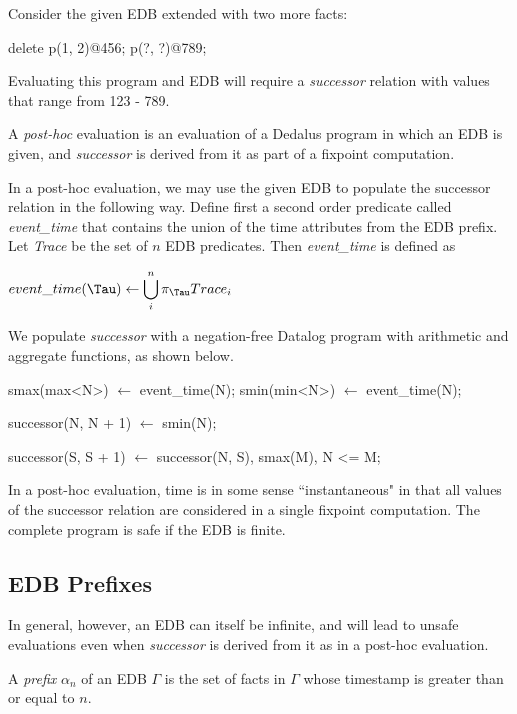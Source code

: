\begin{itemize}
Consider the given EDB extended with two more facts:

\begin{Dedalus}
delete p(1, 2)@456;
p(?, ?)@789;
\end{Dedalus}

Evaluating this program and EDB will require a \emph{successor} relation with values that range from 123 - 789.

\begin{definition}
A \emph{post-hoc} evaluation is an evaluation of a Dedalus program in which an EDB is given, and \emph{successor} is derived from it
as part of a fixpoint computation.
\end{definition}

In a post-hoc evaluation, we may use the given EDB to populate the successor relation in the following way.
Define first a second order predicate called \emph{event\_time}
that contains the union of the time attributes from the EDB prefix. Let \emph{Trace} be the set of $n$ EDB predicates.  
Then \emph{event\_time} is defined as

$event\_time(\Tau) \leftarrow \displaystyle\bigcup_{i}^n \pi_{\Tau}Trace_{i}$

We populate \emph{successor} with a negation-free Datalog program with arithmetic and aggregate functions, as shown below.

\begin{Dedalus}
smax(max<N>) \(\leftarrow\) event\_time(N);
smin(min<N>) \(\leftarrow\) event\_time(N);

successor(N, N + 1) \(\leftarrow\) smin(N);

successor(S, S + 1) \(\leftarrow\) 
    successor(N, S),
    smax(M),
    N <= M;
\end{Dedalus}

In a post-hoc evaluation, time is in some sense ``instantaneous" in that all values of the successor relation are considered in a single
fixpoint computation.  The complete program is safe if the EDB is finite.

\subsection{EDB Prefixes}

In general, however, an EDB can itself be infinite, and will lead to unsafe evaluations even when \emph{successor} is derived from it
as in a post-hoc evaluation.

\begin{definition}
A \emph{prefix} $\alpha_{n}$ of an EDB $\Gamma$ is the set of facts in $\Gamma$ whose timestamp is greater than or equal to $n$. 
\end{definition}


\end{itemize}
